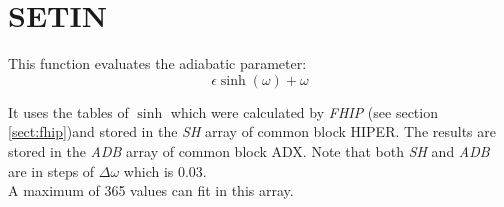 \section{SETIN}
\label{sect:setin}

\noindent This function evaluates the adiabatic parameter:\\

\begin{equation}
\epsilon \sinh(\omega) + \omega
\end{equation}

\noindent It uses the tables of $\sinh$ which were calculated by {\em FHIP}
(see section \ref{sect:fhip})and stored in the {\em SH} array of common block
HIPER. The results are stored in the {\em ADB} array of common block ADX. Note
that both {\em SH} and {\em ADB} are in steps of $\Delta\omega$ which is
0.03.\\

\noindent A maximum of 365 values can fit in this array.\\
